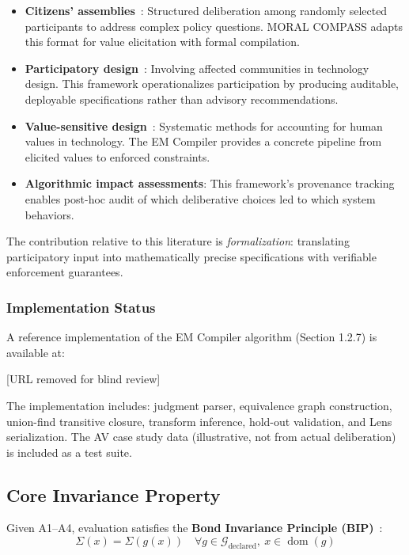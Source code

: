 \documentclass[12pt]{article}
\begin{document}
\begin{itemize}
\item \textbf{Citizens' assemblies}~\cite{fishkin2018}: Structured deliberation among randomly selected participants to
address complex policy questions. MORAL COMPASS adapts this format for value elicitation
with formal compilation.
\item \textbf{Participatory design}~\cite{schuler1993}: Involving affected communities in technology design. This
framework operationalizes participation by producing auditable, deployable specifications
rather than advisory recommendations.
\item \textbf{Value-sensitive design}~\cite{friedman2019}: Systematic methods for accounting for human values in technology. The EM Compiler provides a concrete pipeline from elicited values to enforced constraints.
\item \textbf{Algorithmic impact assessments}: This framework's provenance tracking enables post-hoc
audit of which deliberative choices led to which system behaviors.
\end{itemize}

The contribution relative to this literature is \emph{formalization}: translating participatory input into
mathematically precise specifications with verifiable enforcement guarantees.

\subsubsection{Implementation Status}

A reference implementation of the EM Compiler algorithm (Section 1.2.7) is available at:

\begin{center}
[URL removed for blind review]
\end{center}

The implementation includes: judgment parser, equivalence graph construction, union-find transitive closure, transform inference, hold-out validation, and Lens serialization. The AV case study
data (illustrative, not from actual deliberation) is included as a test suite.

\subsection{Core Invariance Property}

Given A1--A4, evaluation satisfies the \textbf{Bond Invariance Principle (BIP)}~\cite{bond2025bip}:
\[
\Sigma(x) = \Sigma(g(x)) \quad \forall g \in \mathcal{G}_{\text{declared}},\ x \in \operatorname{dom}(g)
\]
\end{document}
